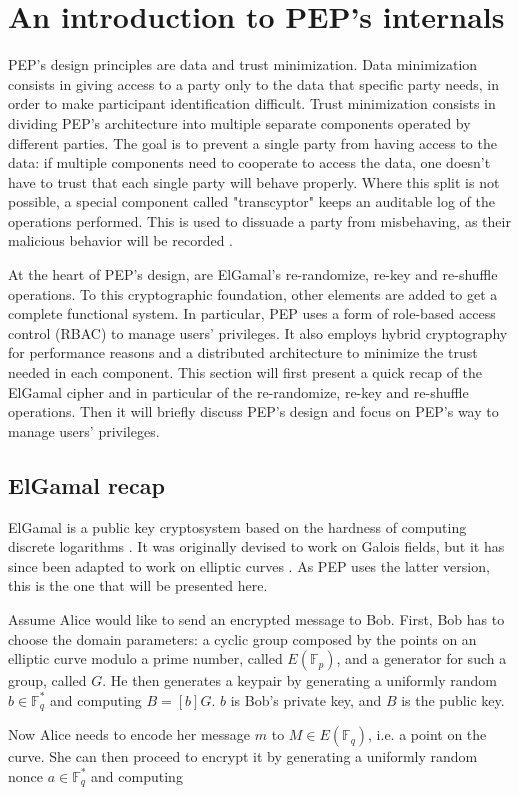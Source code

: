 \documentclass{report}
\begin{document}
\section{An introduction to PEP's internals}
PEP's design principles are data and trust minimization. Data minimization consists in giving access to a party only to the data that specific party needs, in order to make
participant identification difficult. Trust minimization consists in dividing PEP's architecture into multiple separate components operated by different parties. The goal is to
prevent a single party from having access to the data: if multiple components need to cooperate to access the data, one doesn't have to trust that each single party will
behave properly. Where this split is not possible, a special component called "transcyptor" keeps an auditable log of the operations performed. This is used to dissuade a party
from misbehaving, as their malicious behavior will be recorded \cite{pep-blueprint}. \par
At the heart of PEP's design, are ElGamal's re-randomize, re-key and re-shuffle operations. To this cryptographic foundation, other elements are added to get a complete functional system. In
particular, PEP uses a form of role-based access control (RBAC) \cite{rbac} to manage users' privileges. It also employs hybrid cryptography for performance reasons and a
distributed architecture to minimize the trust needed in each component. This section will first present a quick recap of the ElGamal cipher and in particular of the re-randomize, re-key and re-shuffle
operations. Then it will briefly discuss PEP's design and focus on PEP's way to manage users' privileges.

\subsection{ElGamal recap}
ElGamal is a public key cryptosystem based on the hardness of computing discrete logarithms \cite{elgamal}. It was originally devised to work on Galois fields, but it has since
been adapted to work on elliptic curves \cite{elliptic-elgamal}. As PEP uses the latter version, this is the one that will be presented here.\par
Assume Alice would like to send an encrypted message to Bob. First, Bob has to choose the domain parameters: a cyclic group composed by the points on an elliptic curve modulo a
prime number, called $E(\mathds{F}_p)$, and a generator for such a group, called $G$. He then generates a keypair by generating a uniformly random $b \in \mathds{F}^*_q$ and computing
$B=[b]G$. $b$ is Bob's private key, and $B$ is the public key.\par
Now Alice needs to encode her message $m$ to $M \in E(\mathds{F}_q)$, i.e. a point on the curve. She can then proceed to encrypt it by generating a uniformly random nonce $a \in
\mathds{F}^*_q$ and computing
\end{document}
